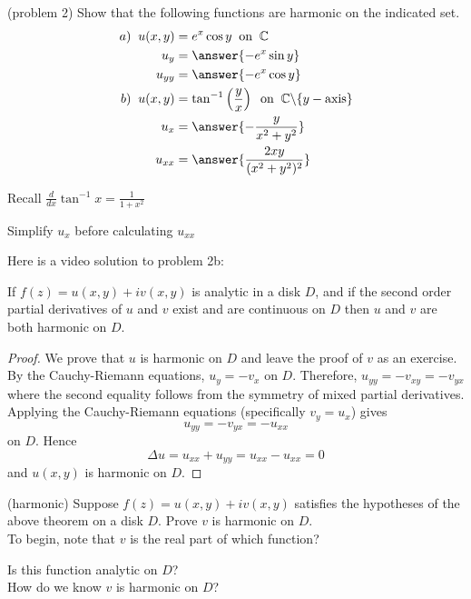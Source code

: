 \documentclass[handout]{ximera}
\begin{document}
\begin{problem}(problem 2)
Show that the following functions are harmonic on the indicated set.\\
\begin{align*}
a) \;\; u(x,y) &= e^x\cos y \;\;\text{on} \;\; \C\\
u_y &= \answer{-e^x \sin y}\\
u_{yy} &= \answer{-e^x \cos y}\\
b) \;\; u(x,y) &= \tan^{-1}\left(\frac{y}{x}\right) \;\; \text{on} \;\; \C\backslash \{y-\text{axis}\}\\
u_x &= \answer{-\frac{y}{x^2+y^2}}\\
u_{xx} &= \answer{\frac{2xy}{(x^2+y^2)^2}}
\end{align*}
\begin{hint}
Recall $\frac{d}{dx} \tan^{-1} x = \frac{1}{1+x^2}$
\end{hint}
\begin{hint}
Simplify $u_x$ before calculating $u_{xx}$
\end{hint}

\end{problem}

Here is a video solution to problem 2b:\\
\begin{foldable}
\end{foldable}

\begin{theorem}
If $f(z) = u(x,y) + iv(x,y)$ is analytic in a disk $D$, and if the second order 
partial derivatives of $u$ and $v$ exist and are continuous on $D$ then $u$ and $v$ are both harmonic on $D$.
\end{theorem}
\begin{proof}
We prove that $u$ is harmonic on $D$ and leave the proof of $v$ as an exercise.\\
By the Cauchy-Riemann equations, $u_y = -v_x$ on $D$.  Therefore, $u_{yy} = -v_{xy} = -v_{yx}$ where the 
second equality follows from the symmetry of mixed partial derivatives. Applying the Cauchy-Riemann 
equations (specifically $v_y = u_x$)  gives
\[
u_{yy} = -v_{yx} = -u_{xx}
\]
on $D$. Hence
\[
\Delta u = u_{xx} + u_{yy} = u_{xx} - u_{xx} = 0
\]
and $u(x,y)$ is harmonic on $D$.
\end{proof}

\begin{problem}(harmonic)
Suppose $f(z) = u(x,y) + iv(x,y)$ satisfies the hypotheses of the above theorem on a disk $D$. 
Prove $v$ is harmonic on $D$.\\
To begin, note that $v$ is the real part of which function?
\begin{multipleChoice}
\end{multipleChoice}
Is this function analytic on $D$? \\
How do we know $v$ is harmonic on $D$? 
\end{problem}
  
\end{document}
